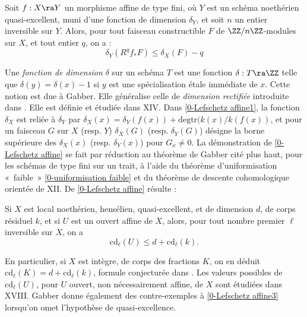 \documentclass[10pt]{../fichiers-configuration-latex/smfart}
\begin{document}
\begin{theoreme}\label{0-Lefschetz affine}
Soit $f : X \ra Y$ un morphisme affine de type fini, où
$Y$ est un schéma noethérien quasi-excellent, muni d'une fonction de dimension $\delta_Y$, et soit
$n$ un entier inversible sur $Y$. Alors, pour tout faisceau constructible $F$ de $\ZZ/n\ZZ$-modules
sur $X$, et tout entier $q$, on a :
\begin{equation}\label{0-Lefschetz affine1}
\delta_Y(R^qf_*F) \le \delta_X(F) - q
\end{equation}
\end{theoreme}
Une \textit{fonction de dimension} $\delta$ sur un
schéma $T$ est une fonction $\delta : T  \ra \ZZ$ telle que $\delta(y) = \delta(x) - 1$ si $y$ est
une spécialisation étale immédiate de $x$. Cette notion est due à Gabber.  Elle généralise celle de
\textit{dimension rectifiée} introduite dans . Elle est définie et étudiée dans XIV.
Dans \ref{0-Lefschetz affine1}, la fonction $\delta_X$ est reliée à $\delta_Y$ par $\delta_X(x) =
\delta_Y(f(x)) + \mathrm{degtr}(k(x)/k(f(x))$, et  pour un faisceau $G$ sur $X$ (resp.  $Y$)
$\delta_X(G)$ (resp. $\delta_Y(G)$) désigne la borne supérieure des $\delta_X(x)$ (resp.
$\delta_Y(x)$) pour $G_x \ne 0$. La démonstration de \ref{0-Lefschetz affine} se fait par réduction
au théorème de Gabber cité plus haut, pour les schémas de type fini sur un trait, à l'aide du
théorème d'uniformisation « faible » \ref{0-uniformisation faible} et du théorème de descente
cohomologique orientée de XII. De \ref{0-Lefschetz affine} résulte :
\begin{corollaire}\label{0-Lefschetz affine2} Si $X$ est local noethérien, hensélien,
quasi-excellent, et de dimension $d$, de corps résiduel $k$, et si $U$ est un ouvert affine de $X$,
alors, pour tout nombre premier $\ell$ inversible sur $X$, on a \begin{equation}\label{0-Lefschetz
affine3} \mathrm{cd}_{\ell}(U) \le d + \mathrm{cd}_{\ell}(k).  \end{equation} \end{corollaire} En
particulier, si $X$ est intègre, de corps des fractions $K$, on en déduit $\mathrm{cd}_{\ell}(K) = d
+ \mathrm{cd}_{\ell}(k)$, formule conjecturée dans . Les valeurs possibles de
$\mathrm{cd}_{\ell}(U)$, pour $U$ ouvert, non nécessairement affine, de $X$ sont étudiées dans
XVIII. Gabber donne également des contre-exemples à \ref{0-Lefschetz affine3} lorsqu'on omet
l'hypothèse de quasi-excellence. 
\end{document}
